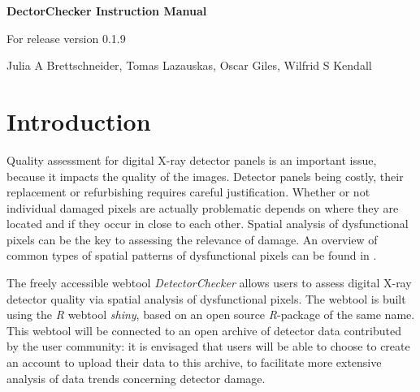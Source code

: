 \documentclass[11pt,a4paper,twosided]{article}
\newcommand{\DetectorChecker}{\emph{DetectorChecker}\xspace}
\newcommand{\Rsoftware}{\emph{R}\xspace}
\begin{document}


\begin{center}

{\Large\bf DectorChecker Instruction Manual}

\bigskip
{\Large For release version 0.1.9}

\bigskip
{\large Julia A Brettschneider, Tomas Lazauskas, Oscar Giles, Wilfrid S Kendall}



\medskip
\end{center}




\section{Introduction}\label{int}

Quality assessment for digital X-ray detector panels is an important issue, because
it impacts the quality of the images. 
Detector panels being costly, 
their replacement or refurbishing requires careful justification.
Whether or not individual damaged pixels are actually 
problematic depends on where they are located and if they occur in close to each other.
Spatial analysis of dysfunctional pixels can be the key to assessing the relevance of damage.
An overview of 
common
types of spatial patterns of dysfunctional pixels can be found in  
\cite{brettschneider2014crism}. 

The freely accessible webtool \DetectorChecker allows users to assess digital X-ray 
detector quality via spatial analysis of dysfunctional pixels.
The webtool is built using the \Rsoftware webtool \emph{shiny}, based on an open source \Rsoftware-package of the same name.
This webtool will be
connected to an open archive of detector data contributed by the user community:
it is envisaged that users will be able to choose to create an account to upload their data to this archive,
to facilitate more extensive analysis of data trends concerning detector damage.
\end{document}
